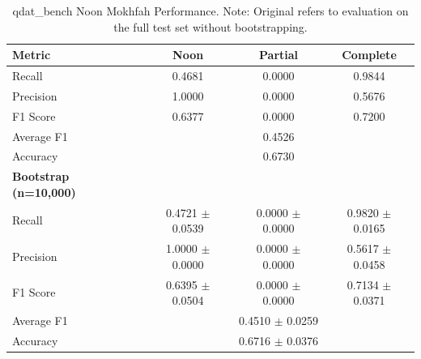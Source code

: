 \begin{table}[t]
	\centering
	\begin{tabular}{lccc}
		\hline
		\textbf{Metric}               & \textbf{Noon}                           & \textbf{Partial}    & \textbf{Complete}   \\
		\hline
		Recall                        & 0.4681                                  & 0.0000              & 0.9844              \\
		Precision                     & 1.0000                                  & 0.0000              & 0.5676              \\
		F1 Score                      & 0.6377                                  & 0.0000              & 0.7200              \\
		Average F1                    & \multicolumn{3}{c}{0.4526}                                                          \\
		Accuracy                      & \multicolumn{3}{c}{0.6730}                                                          \\
		\hline
		\textbf{Bootstrap (n=10,000)} & \textbf{}                               & \textbf{}           & \textbf{}           \\
		Recall                        & 0.4721 $\pm$ 0.0539                     & 0.0000 $\pm$ 0.0000 & 0.9820 $\pm$ 0.0165 \\
		Precision                     & 1.0000 $\pm$ 0.0000                     & 0.0000 $\pm$ 0.0000 & 0.5617 $\pm$ 0.0458 \\
		F1 Score                      & 0.6395 $\pm$ 0.0504                     & 0.0000 $\pm$ 0.0000 & 0.7134 $\pm$ 0.0371 \\
		Average F1                    & \multicolumn{3}{c}{0.4510 $\pm$ 0.0259}                                           \\
		Accuracy                      & \multicolumn{3}{c}{0.6716 $\pm$ 0.0376}                                           \\
		\hline
	\end{tabular}
	\caption{qdat\_bench Noon Mokhfah Performance. Note: Original refers to evaluation on the full test set without bootstrapping.}
	\label{tab:qdat_noon_mokhfah}
\end{table}


